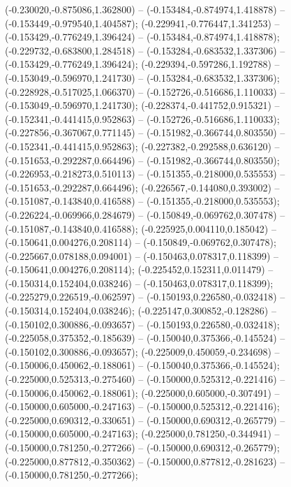  (-0.230020,-0.875086,1.362800) -- (-0.153484,-0.874974,1.418878) -- (-0.153449,-0.979540,1.404587);
 (-0.229941,-0.776447,1.341253) -- (-0.153429,-0.776249,1.396424) -- (-0.153484,-0.874974,1.418878);
 (-0.229732,-0.683800,1.284518) -- (-0.153284,-0.683532,1.337306) -- (-0.153429,-0.776249,1.396424);
 (-0.229394,-0.597286,1.192788) -- (-0.153049,-0.596970,1.241730) -- (-0.153284,-0.683532,1.337306);
 (-0.228928,-0.517025,1.066370) -- (-0.152726,-0.516686,1.110033) -- (-0.153049,-0.596970,1.241730);
 (-0.228374,-0.441752,0.915321) -- (-0.152341,-0.441415,0.952863) -- (-0.152726,-0.516686,1.110033);
 (-0.227856,-0.367067,0.771145) -- (-0.151982,-0.366744,0.803550) -- (-0.152341,-0.441415,0.952863);
 (-0.227382,-0.292588,0.636120) -- (-0.151653,-0.292287,0.664496) -- (-0.151982,-0.366744,0.803550);
 (-0.226953,-0.218273,0.510113) -- (-0.151355,-0.218000,0.535553) -- (-0.151653,-0.292287,0.664496);
 (-0.226567,-0.144080,0.393002) -- (-0.151087,-0.143840,0.416588) -- (-0.151355,-0.218000,0.535553);
 (-0.226224,-0.069966,0.284679) -- (-0.150849,-0.069762,0.307478) -- (-0.151087,-0.143840,0.416588);
 (-0.225925,0.004110,0.185042) -- (-0.150641,0.004276,0.208114) -- (-0.150849,-0.069762,0.307478);
 (-0.225667,0.078188,0.094001) -- (-0.150463,0.078317,0.118399) -- (-0.150641,0.004276,0.208114);
 (-0.225452,0.152311,0.011479) -- (-0.150314,0.152404,0.038246) -- (-0.150463,0.078317,0.118399);
 (-0.225279,0.226519,-0.062597) -- (-0.150193,0.226580,-0.032418) -- (-0.150314,0.152404,0.038246);
 (-0.225147,0.300852,-0.128286) -- (-0.150102,0.300886,-0.093657) -- (-0.150193,0.226580,-0.032418);
 (-0.225058,0.375352,-0.185639) -- (-0.150040,0.375366,-0.145524) -- (-0.150102,0.300886,-0.093657);
 (-0.225009,0.450059,-0.234698) -- (-0.150006,0.450062,-0.188061) -- (-0.150040,0.375366,-0.145524);
 (-0.225000,0.525313,-0.275460) -- (-0.150000,0.525312,-0.221416) -- (-0.150006,0.450062,-0.188061);
 (-0.225000,0.605000,-0.307491) -- (-0.150000,0.605000,-0.247163) -- (-0.150000,0.525312,-0.221416);
 (-0.225000,0.690312,-0.330651) -- (-0.150000,0.690312,-0.265779) -- (-0.150000,0.605000,-0.247163);
 (-0.225000,0.781250,-0.344941) -- (-0.150000,0.781250,-0.277266) -- (-0.150000,0.690312,-0.265779);
 (-0.225000,0.877812,-0.350362) -- (-0.150000,0.877812,-0.281623) -- (-0.150000,0.781250,-0.277266);
